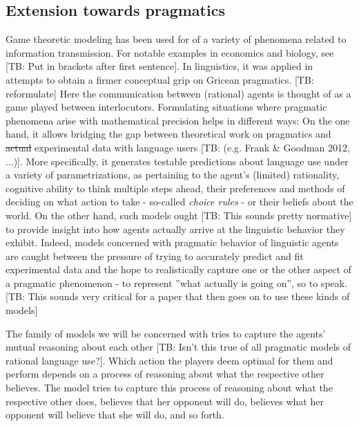 \documentclass[10pt]{article}
\newcommand{\tb}[1]{\textcolor[rgb]{.8,.33,.0}{[TB: #1]}}%
\begin{document}
\subsection{Extension towards pragmatics}
Game theoretic modeling has been used for of a variety of phenomena related to information transmission. For notable examples in economics and biology, see \cite{spence1973job, smith1982evolution, cho1987signaling} \tb{Put in brackets after first sentence}.
In linguistics, it was applied in attempts to obtain a firmer conceptual grip on Gricean pragmatics. \tb{reformulate}
Here the communication between (rational) agents is thought of as a game played between interlocutors. Formulating situations where pragmatic phenomena arise with mathematical precision helps in different ways: On the one hand, it allows bridging the gap between theoretical work on pragmatics and \sout{actual} experimental data with language users \tb{(e.g. Frank \& Goodman 2012, ...)}. More specifically, it generates testable predictions about language use under a variety of parametrizations, as pertaining to the agent's (limited) rationality, cognitive ability to think multiple steps ahead, their preferences and methods of deciding on what action to take - so-called \textit{choice rules} %
 - or their beliefs about the world. On the other hand, such models ought \tb{This sounds pretty normative} to provide insight into how agents actually arrive at the linguistic behavior they exhibit. %
 Indeed, models concerned with pragmatic behavior of linguistic agents are caught between the pressure of trying to accurately predict and fit experimental data and the hope to realistically capture one or the other aspect of a pragmatic phenomenon - to represent ''what actually is going on'', so to speak. \tb{This sounds very critical for a paper that then goes on to use these kinds of models}

The family of models we will be concerned with tries to capture the agents' mutual reasoning about each other \tb{Isn't this true of all pragmatic models of rational language use?}. Which action the players deem optimal for them and perform depends on a process of reasoning about what the respective other believes. The model tries to capture this process of reasoning about what the respective other does, believes that her opponent will do, believes what her opponent will believe that she will do, and so forth.
\end{document}
